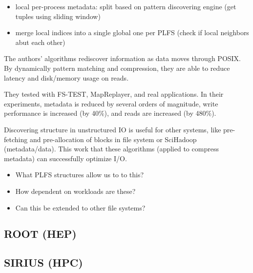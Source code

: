 \begin{itemize}

  \item local per-process metadata: split based on pattern discovering engine
  (get tuples using sliding window)

  \item merge local indices into a single global one per PLFS (check if local
  neighbors abut each other)

\end{itemize}

The authors' algorithms rediscover information as data moves through POSIX. By
dynamically  pattern matching and compression, they are able to reduce latency
and disk/memory usage on reads. 

They tested with FS-TEST, MapReplayer, and real applications. In their
experiments, metadata is reduced by several orders of magnitude, write
performance is increased (by 40\%), and reads are increased (by 480\%). 


Discovering structure in unstructured IO is useful for other systems, like
pre-fetching and pre-allocation of blocks in file system or SciHadoop
(metadata/data). This work that these algorithms (applied to compress metadata)
can successfully optimize I/O. 

\begin{itemize}

  \item What PLFS structures allow us to to this?

  \item How dependent on workloads are these?

  \item Can this be extended to other file systems?

\end{itemize}



\subsection{ROOT (HEP)}
\subsection{SIRIUS (HPC)}
